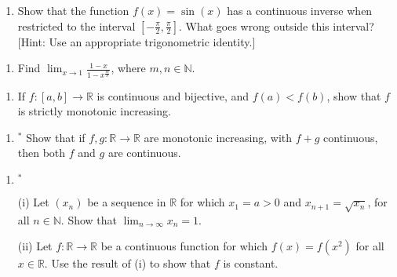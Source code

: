 \documentclass[letterpaper,10pt,english]{jupyterBook}
\begin{document}
\label{\detokenize{Problems:id32}}\begin{enumerate}
%
\setcounter{enumi}{31}
\item {} 
\sphinxAtStartPar
Show that the function \(f(x) = \sin(x)\) has a continuous inverse when restricted to the interval \(\left[-\frac{\pi}{2}, \frac{\pi}{2}\right]\). What goes wrong outside this interval? {[}Hint: Use an appropriate trigonometric identity.{]}

\end{enumerate}
\label{\detokenize{Problems:id33}}\begin{enumerate}
%
\setcounter{enumi}{32}
\item {} 
\sphinxAtStartPar
Find \(\displaystyle\lim_{x \rightarrow 1}\frac{1 - x}{1 - x^{\frac{m}{n}}}\), where \(m, n \in \mathbb{N}\).

\end{enumerate}
\label{\detokenize{Problems:id34}}\begin{enumerate}
%
\setcounter{enumi}{33}
\item {} 
\sphinxAtStartPar
If \(f:[a, b] \rightarrow \mathbb{R}\) is continuous and bijective, and \(f(a) < f(b)\), show that \(f\) is strictly monotonic increasing.

\end{enumerate}
\label{\detokenize{Problems:id35}}\begin{enumerate}
%
\setcounter{enumi}{34}
\item {} 
\sphinxAtStartPar
\(^*\) Show that if \(f, g: \mathbb{R} \rightarrow \mathbb{R}\)  are monotonic increasing, with \(f+g\) continuous, then both \(f\) and \(g\) are continuous.

\end{enumerate}
\label{\detokenize{Problems:id36}}\begin{enumerate}
%
\setcounter{enumi}{35}
\item {} 
\sphinxAtStartPar
\(^*\)

\sphinxAtStartPar
(i) Let \((x_{n})\) be a sequence in \(\mathbb{R}\) for which \(x_{1} = a > 0\) and \(x_{n+1} = \sqrt{x_{n}}\), for all \(n\in\mathbb{N}\). Show that \(\displaystyle\lim_{n \rightarrow \infty} x_{n} = 1\).

\sphinxAtStartPar
(ii) Let \(f: \mathbb{R} \rightarrow \mathbb{R}\) be a continuous function for which \(f(x) = f(x^{2})\) for all \(x \in \mathbb{R}\). Use the result of (i) to show that \(f\) is constant.

\end{enumerate}
\end{document}
